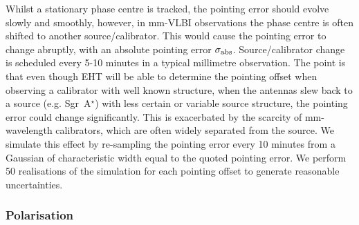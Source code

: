 Whilst a stationary phase centre is tracked, the pointing error should evolve slowly and smoothly, however, in mm-VLBI observations the phase centre is often shifted to another source/calibrator. This would cause the pointing error to change abruptly, with an absolute pointing error $\sigma_{\rm abs}$. Source/calibrator change is scheduled every 5-10 minutes in a typical millimetre observation. The point is that even though EHT will be able to determine the pointing offset when observing a calibrator with well known structure, when the antennas slew back to a source (e.g. Sgr~A$^\star$) with less certain or variable source structure, the pointing error could change significantly. This is exacerbated by the scarcity of mm-wavelength calibrators, which are often widely separated from the source. We simulate this effect by re-sampling the pointing error every 10 minutes from a Gaussian of characteristic width equal to the quoted pointing error. We perform 50 realisations of the simulation for each pointing offset to generate reasonable uncertainties.




\subsubsection{Polarisation}



